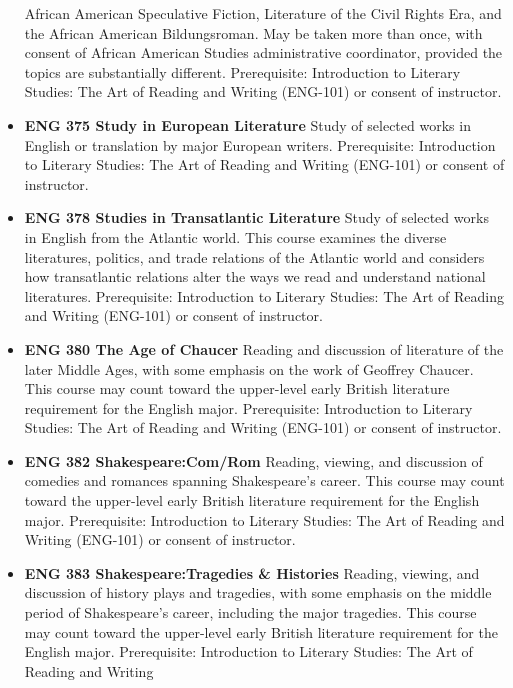 \documentclass[
  letterpaper,
]{scrbook}
\begin{document}
\begin{itemize}
  African American Speculative Fiction, Literature of the Civil Rights
  Era, and the African American Bildungsroman. May be taken more than
  once, with consent of African American Studies administrative
  coordinator, provided the topics are substantially different.
  Prerequisite: Introduction to Literary Studies: The Art of Reading and
  Writing (ENG-101) or consent of instructor.\\
\item
  \textbf{ENG 375 Study in European Literature} Study of selected works
  in English or translation by major European writers. Prerequisite:
  Introduction to Literary Studies: The Art of Reading and Writing
  (ENG-101) or consent of instructor.\\
\item
  \textbf{ENG 378 Studies in Transatlantic Literature} Study of selected
  works in English from the Atlantic world. This course examines the
  diverse literatures, politics, and trade relations of the Atlantic
  world and considers how transatlantic relations alter the ways we read
  and understand national literatures. Prerequisite: Introduction to
  Literary Studies: The Art of Reading and Writing (ENG-101) or consent
  of instructor.\\
\item
  \textbf{ENG 380 The Age of Chaucer} Reading and discussion of
  literature of the later Middle Ages, with some emphasis on the work of
  Geoffrey Chaucer. This course may count toward the upper-level early
  British literature requirement for the English major. Prerequisite:
  Introduction to Literary Studies: The Art of Reading and Writing
  (ENG-101) or consent of instructor.\\
\item
  \textbf{ENG 382 Shakespeare:Com/Rom} Reading, viewing, and discussion
  of comedies and romances spanning Shakespeare's career. This course
  may count toward the upper-level early British literature requirement
  for the English major. Prerequisite: Introduction to Literary Studies:
  The Art of Reading and Writing (ENG-101) or consent of instructor.\\
\item
  \textbf{ENG 383 Shakespeare:Tragedies \& Histories} Reading, viewing,
  and discussion of history plays and tragedies, with some emphasis on
  the middle period of Shakespeare's career, including the major
  tragedies. This course may count toward the upper-level early British
  literature requirement for the English major. Prerequisite:
  Introduction to Literary Studies: The Art of Reading and Writing

\end{itemize}
\end{document}
